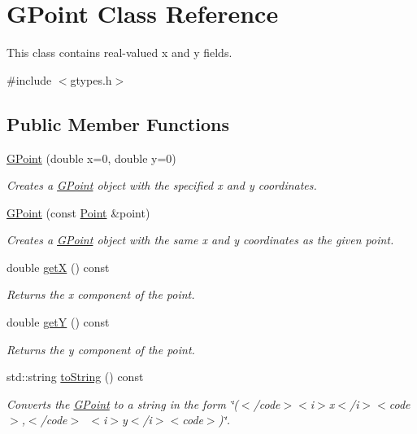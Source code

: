 \hypertarget{classGPoint}{}\section{G\+Point Class Reference}
\label{classGPoint}


This class contains real-\/valued x and y fields.  




{\ttfamily \#include $<$gtypes.\+h$>$}

\subsection*{Public Member Functions}
\begin{DoxyCompactItemize}
\item 
\mbox{\hyperlink{classGPoint_a8c6ed804b0b13bce303a77ff4fbb64b1}{G\+Point}} (double x=0, double y=0)
\begin{DoxyCompactList}\small\item\em Creates a {\ttfamily \mbox{\hyperlink{classGPoint}{G\+Point}}} object with the specified {\ttfamily x} and {\ttfamily y} coordinates. \end{DoxyCompactList}\item 
\mbox{\hyperlink{classGPoint_add4732bf649d02caab4d24487e0f5caa}{G\+Point}} (const \mbox{\hyperlink{classPoint}{Point}} \&point)
\begin{DoxyCompactList}\small\item\em Creates a {\ttfamily \mbox{\hyperlink{classGPoint}{G\+Point}}} object with the same {\ttfamily x} and {\ttfamily y} coordinates as the given point. \end{DoxyCompactList}\item 
double \mbox{\hyperlink{classGPoint_a344385751bee0720059403940d57a13e}{getX}} () const
\begin{DoxyCompactList}\small\item\em Returns the x component of the point. \end{DoxyCompactList}\item 
double \mbox{\hyperlink{classGPoint_aafa51c7f8f38a09febbb9ce7853f77b4}{getY}} () const
\begin{DoxyCompactList}\small\item\em Returns the y component of the point. \end{DoxyCompactList}\item 
std\+::string \mbox{\hyperlink{classGPoint_a1fe5121d6528fdea3f243321b3fa3a49}{to\+String}} () const
\begin{DoxyCompactList}\small\item\em Converts the {\ttfamily \mbox{\hyperlink{classGPoint}{G\+Point}}} to a string in the form {\ttfamily \char`\"{}($<$/code$>$$<$i$>$x$<$/i$>$$<$code$>$,$<$/code$>$~$<$i$>$y$<$/i$>$$<$code$>$)\char`\"{}}. \end{DoxyCompactList}\end{DoxyCompactItemize}
